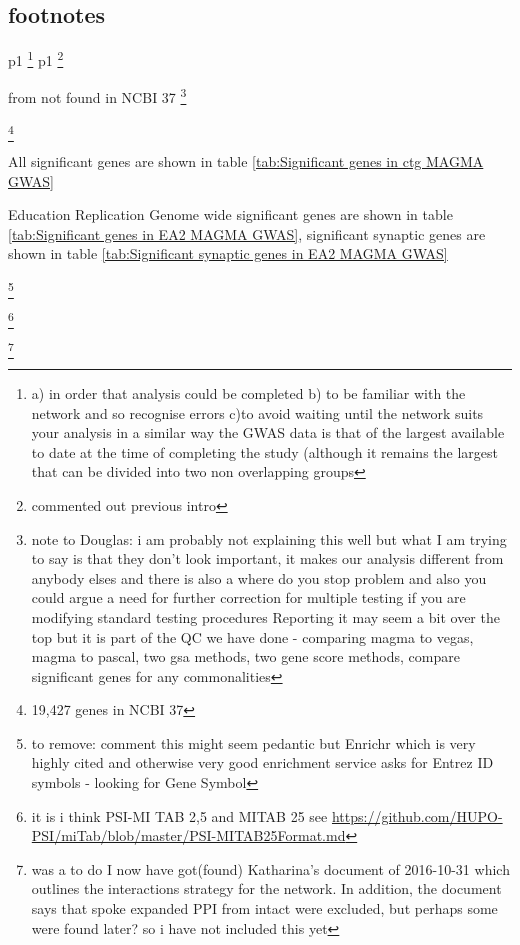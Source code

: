 
\subsection{footnotes}
p1
\footnote{a) in order that analysis could be completed b) to be familiar with the network and so recognise errors c)to avoid waiting until the network suits your analysis in a similar way the GWAS data is that of the largest available to date at the time of completing the study (although it remains the largest that can be divided into two non overlapping groups} 
p1
\footnote{commented out previous intro}

from not found in NCBI 37
\footnote{note to Douglas: i am probably not explaining this well but what I am trying to say is that they don't look important, it makes our analysis different from anybody elses and there is also a where do you stop problem and also you could argue a need for further correction for multiple testing if you are modifying standard testing procedures Reporting it may seem a bit over the top but it is part of the QC we have done - comparing magma to vegas, magma to pascal, two gsa methods, two gene score methods, compare significant genes for any commonalities}  

\footnote{19,427 genes in NCBI 37}


All significant genes are shown in table \ref{tab:Significant genes in ctg MAGMA GWAS} 


Education Replication
Genome wide significant genes  are shown in table \ref{tab:Significant genes in EA2 MAGMA GWAS}, significant synaptic genes are shown in table \ref{tab:Significant synaptic genes in EA2  MAGMA GWAS}

\footnote{to remove: comment this might seem pedantic but Enrichr which is very highly cited and otherwise very good enrichment service asks for Entrez ID symbols - looking for Gene Symbol}


\footnote{it is i think PSI-MI TAB 2,5 and MITAB 25 see \url{https://github.com/HUPO-PSI/miTab/blob/master/PSI-MITAB25Format.md}}

\footnote{was a to do I now have got(found) Katharina's document of 2016-10-31 which outlines the interactions strategy for the network. In addition, the document says that spoke expanded PPI from intact were excluded, but perhaps some were found later? so i have not included this yet}

